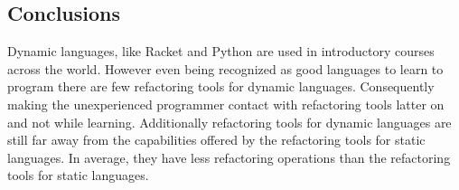\subsection{Conclusions}







Dynamic languages, like Racket and Python are used in introductory courses across the world.
However even being recognized as good languages to learn to program there are few refactoring tools for dynamic languages. 
Consequently making the unexperienced programmer contact with refactoring tools latter on and not while learning.
Additionally refactoring tools for dynamic languages are still far away from the capabilities offered by the refactoring tools for static languages. 
In average, they have less refactoring operations than the refactoring tools for static languages.

